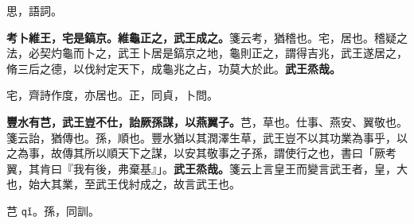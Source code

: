 \begin{quoting}思，語詞。\end{quoting}

\textbf{考卜維王，宅是鎬京。維龜正之，武王成之。}{\footnotesize 箋云考，猶稽也。宅，居也。稽疑之法，必契灼龜而卜之，武王卜居是鎬京之地，龜則正之，謂得吉兆，武王遂居之，脩三后之德，以伐紂定天下，成龜兆之占，功莫大於此。}\textbf{武王烝哉。}

\begin{quoting}宅，齊詩作度，亦居也。正，同貞，卜問。\end{quoting}

\textbf{豐水有芑，武王豈不仕，詒厥孫謀，以燕翼子。}{\footnotesize 芑，草也。仕事、燕安、翼敬也。箋云詒，猶傳也。孫，順也。豐水猶以其潤澤生草，武王豈不以其功業為事乎，以之為事，故傳其所以順天下之謀，以安其敬事之子孫，謂使行之也，書曰「厥考翼，其肯曰『我有後，弗棄基』」。}\textbf{武王烝哉。}{\footnotesize 箋云上言皇王而變言武王者，皇，大也，始大其業，至武王伐紂成之，故言武王也。}

\begin{quoting}芑 \texttt{qǐ}。孫，同訓。\end{quoting}

